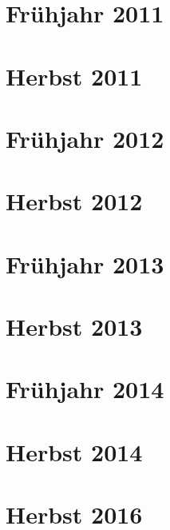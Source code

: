 \documentclass{lehramt-informatik-examen-sammlung}
\begin{document}
\section{Frühjahr 2011}


\section{Herbst 2011}


\section{Frühjahr 2012}


\section{Herbst 2012}


\section{Frühjahr 2013}


\section{Herbst 2013}


\section{Frühjahr 2014}


\section{Herbst 2014}


\section{Herbst 2016}

\end{document}
